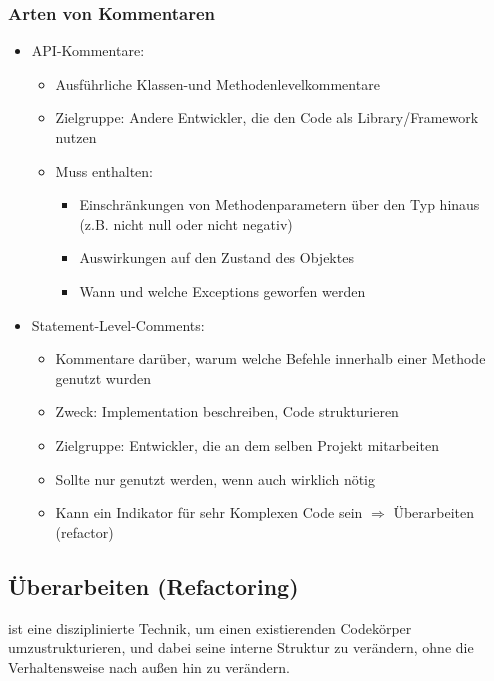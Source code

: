 \documentclass[
    ngerman,
    color=3b,
    summary,
    boxarc,
    main,
]{rubos-tuda-template}
\begin{document}
\subsubsection{Arten von Kommentaren}
\begin{itemize}
    \item API-Kommentare:\begin{itemize}
              \item Ausführliche Klassen-und Methodenlevelkommentare
              \item Zielgruppe: Andere Entwickler, die den Code als Library/Framework nutzen
              \item Muss enthalten:\begin{itemize}
                        \item Einschränkungen von Methodenparametern über den Typ hinaus (z.B. nicht null oder nicht negativ)
                        \item Auswirkungen auf den Zustand des Objektes
                        \item Wann und welche Exceptions geworfen werden
                    \end{itemize}
          \end{itemize}
    \item Statement-Level-Comments:\begin{itemize}
              \item Kommentare darüber, warum welche Befehle innerhalb einer Methode genutzt wurden
              \item Zweck: Implementation beschreiben, Code strukturieren
              \item Zielgruppe: Entwickler, die an dem selben Projekt mitarbeiten
              \item Sollte nur genutzt werden, wenn auch wirklich nötig
              \item Kann ein Indikator für sehr Komplexen Code sein $\Rightarrow$ Überarbeiten (refactor)
          \end{itemize}
\end{itemize}

\clearpage
\subsection{Überarbeiten (Refactoring)}
\begin{definition}[Refactoring]
    ist eine disziplinierte Technik, um einen existierenden Codekörper umzustrukturieren, und dabei seine interne Struktur zu verändern, ohne die Verhaltensweise nach außen hin zu verändern.
\end{definition}
\end{document}
